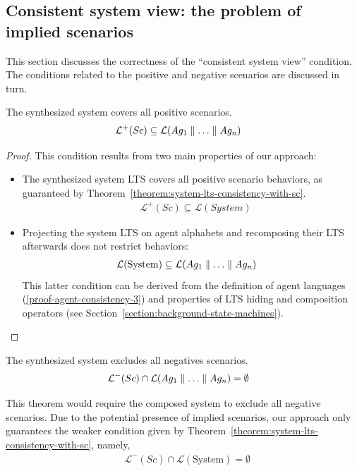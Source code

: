 
\subsection{Consistent system view: the problem of implied scenarios\label{subsection:consistent-system-view}}

This section discusses the correctness of the ``consistent system view'' condition. The conditions related to the positive and negative scenarios are discussed in turn.

\begin{theorem}
The synthesized system covers all positive scenarios.
\begin{align*}
&\mathcal{L}^+(Sc) \subseteq \mathcal{L}(Ag_1 \parallel \ldots \parallel Ag_n)
\end{align*}

\begin{proof}
This condition results from two main properties of our approach:
\begin{itemize}
\item The synthesized system LTS covers all positive scenario behaviors, as guaranteed by Theorem~\ref{theorem:system-lts-consistency-with-sc}.
\begin{align*}
&\mathcal{L}^+(Sc) \subseteq \mathcal{L}(System)
\end{align*}
\item Projecting the system LTS on agent alphabets and recomposing their LTS afterwards does not restrict behaviors:
\begin{align*}
&\mathcal{L}(\mbox{System}) \subseteq \mathcal{L}(Ag_1 \parallel \ldots \parallel Ag_n)
\end{align*}
This latter condition can be derived from the definition of agent languages (\ref{proof-agent-consistency-3}) and properties of LTS hiding and composition operators (see Section~\ref{section:background-state-machines}).
\end{itemize} 

\end{proof}
\end{theorem}

\begin{theorem}
The synthesized system excludes all negatives scenarios.
\begin{align*}
&\mathcal{L}^-(Sc) \cap \mathcal{L}(Ag_1 \parallel \ldots \parallel Ag_n) = \emptyset
\end{align*}
\end{theorem}

This theorem would require the composed system to exclude all negative scenarios. Due to the potential presence of implied scenarios, our approach only guarantees the weaker condition given by Theorem~\ref{theorem:system-lts-consistency-with-sc}, namely,
\begin{align*}
&\mathcal{L}^-(Sc) \cap \mathcal{L}(\mbox{System}) = \emptyset
\end{align*}

